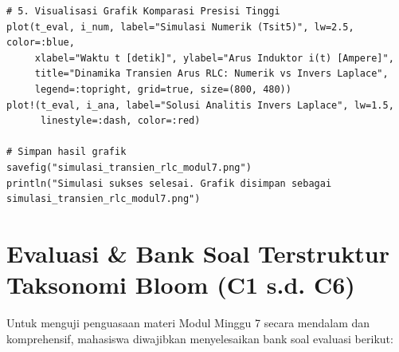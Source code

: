 \documentclass[11pt,a4paper]{article}
\theoremstyle{definition}
\begin{document}
\begin{lstlisting}[style=juliastyle, caption={Skrip Julia untuk simulasi transien RLC dan validasi Invers Laplace.}, label={lst:julia_rlc_laplace}]
# 5. Visualisasi Grafik Komparasi Presisi Tinggi
plot(t_eval, i_num, label="Simulasi Numerik (Tsit5)", lw=2.5, color=:blue,
     xlabel="Waktu t [detik]", ylabel="Arus Induktor i(t) [Ampere]",
     title="Dinamika Transien Arus RLC: Numerik vs Invers Laplace",
     legend=:topright, grid=true, size=(800, 480))
plot!(t_eval, i_ana, label="Solusi Analitis Invers Laplace", lw=1.5,
      linestyle=:dash, color=:red)

# Simpan hasil grafik
savefig("simulasi_transien_rlc_modul7.png")
println("Simulasi sukses selesai. Grafik disimpan sebagai simulasi_transien_rlc_modul7.png")
\end{lstlisting}

\section{Evaluasi \& Bank Soal Terstruktur Taksonomi Bloom (C1 s.d. C6)}

Untuk menguji penguasaan materi Modul Minggu 7 secara mendalam dan komprehensif, mahasiswa diwajibkan menyelesaikan bank soal evaluasi berikut:
\end{document}
